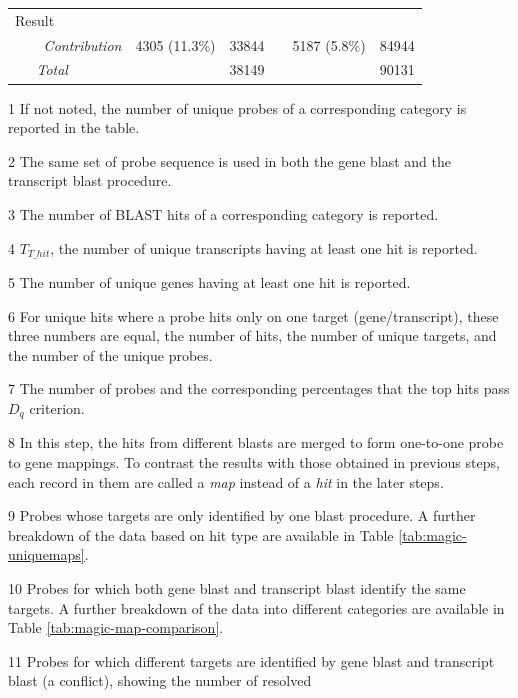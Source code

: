 \begin{table}
\begin{threeparttable}
\begin{footnotesize}
\begin{tabular}{@{}p{3cm}r|rcr|r}
		\multicolumn{6}{l}{Result} \\[.1ex]
	{\it ~~~~Contribution\tnote{13}} & 4305 (11.3\%) & 33844 && 5187 
			(5.8\%) & 84944 \\
	{\it ~~~Total} & \multicolumn{2}{r}{38149} && 		
			\multicolumn{2}{r}{90131} \\
	\bottomrule
	\end{tabular}
	\end{footnotesize}
	\begin{scriptsize}
	\begin{tablenotes}
	\item[1] If not noted, the number of unique probes of a corresponding 
		category is reported in the table.
	\item[2] The same set of probe sequence is used in both the gene blast and 	
		the transcript blast procedure.
	\item[3] The number of BLAST hits of a corresponding category is reported.
	\item[4] $T_{T\_hit}$, the number of unique transcripts having at least one 
		hit is reported.
	\item[5] The number of unique genes having at least one hit is reported.
	\item[6] For unique hits where a probe hits only on one target 
		(gene/transcript), these three numbers are equal, the number of hits, 
		the number of unique targets, and the number of the unique probes.
	\item[7] The number of probes and the corresponding percentages that the 
		top hits pass $D_q$ criterion.
	\item[8] In this step, the hits from different blasts are merged to form 
		one-to-one probe to gene mappings. To contrast the results with those
		obtained in previous steps, each record in them are called a 
		\textit{map} instead of a \textit{hit} in the later steps.
	\item[9] Probes whose targets are only identified by one blast procedure. A 
		further breakdown of the data based on hit type are available in Table 
		\ref{tab:magic-uniquemaps}.
	\item[10] Probes for which both gene blast and transcript blast identify the
	 	same targets. A further breakdown of the data into different 
	 	categories are available in Table \ref{tab:magic-map-comparison}.
	\item[11] Probes for which different targets are identified by gene blast 
		and transcript blast (a conflict), showing the number of resolved 

\end{tablenotes}
\end{scriptsize}
\end{threeparttable}
\end{table}
